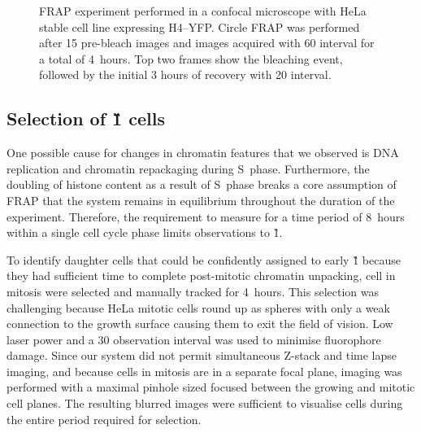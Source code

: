    \begin{figure}
      \centering
        {
          FRAP experiment performed in a confocal microscope with HeLa
          stable cell line expressing H4--YFP.  Circle FRAP was
          performed after 15 pre-bleach images and images acquired
          with \SI{60}{\sec} interval for a total of 4~hours.  Top two
          frames show the bleaching event, followed by the initial 3
          hours of recovery with \SI{20}{\min} interval.
        }
      \label{fig:kill-frap:frap-spot-movement}
    \end{figure}

    \subsection{Selection of \G1{} cells}

    One possible cause for changes in chromatin features that we observed
    is DNA replication and chromatin repackaging during S~phase.
    Furthermore, the doubling of histone content as a result of S~phase breaks
    a core assumption of FRAP that the system remains in equilibrium
    throughout the duration of the experiment.
    Therefore, the requirement to measure for a time period of 8~hours
    within a single cell cycle phase limits observations to \G1{}.

    To identify daughter cells that could be confidently assigned to early \G1{}
    because they had sufficient time to complete
    post-mitotic chromatin unpacking,
    cell in mitosis were selected and manually tracked for 4~hours.
    This selection was challenging because HeLa mitotic cells round up
    as spheres with only a weak connection to the growth surface
    causing them to exit the field of vision.
    Low laser power and a \SI{30}{\min} observation interval
    was used to minimise fluorophore damage.
    Since our system did not permit simultaneous
    Z-stack and time lapse imaging,
    and because cells in mitosis are in a separate focal plane,
    imaging was performed with a maximal pinhole sized focused
    between the growing and mitotic cell planes.
    The resulting blurred images were sufficient to visualise cells during
    the entire period required for selection.

